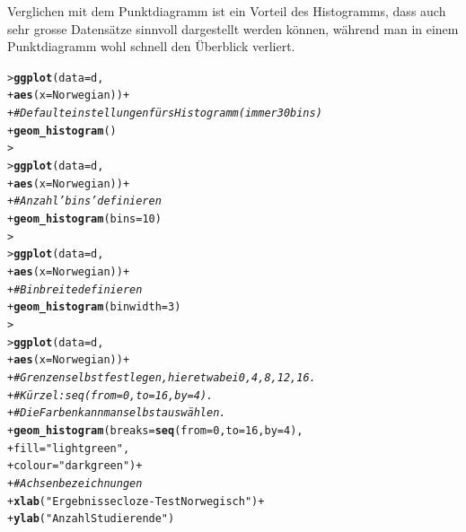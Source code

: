 \documentclass[oneside, 10pt]{book}\usepackage[]{graphicx}\usepackage[]{xcolor}
\makeatletter
\newcommand{\hlnum}[1]{\textcolor[rgb]{0.686,0.059,0.569}{#1}}%
\newcommand{\hlstr}[1]{\textcolor[rgb]{0.192,0.494,0.8}{#1}}%
\newcommand{\hlcom}[1]{\textcolor[rgb]{0.678,0.584,0.686}{\textit{#1}}}%
\newcommand{\hlopt}[1]{\textcolor[rgb]{0,0,0}{#1}}%
\newcommand{\hlstd}[1]{\textcolor[rgb]{0.345,0.345,0.345}{#1}}%
\newcommand{\hlkwc}[1]{\textcolor[rgb]{0.333,0.667,0.333}{#1}}%
\newcommand{\hlkwd}[1]{\textcolor[rgb]{0.737,0.353,0.396}{\textbf{#1}}}%
\newenvironment{kframe}{%
 \def\at@end@of@kframe{}%
 \ifinner\ifhmode%
  \def\at@end@of@kframe{\end{minipage}}%
  \begin{minipage}{\columnwidth}%
 \fi\fi%
 \def\FrameCommand##1{\hskip\@totalleftmargin \hskip-\fboxsep
 \colorbox{shadecolor}{##1}\hskip-\fboxsep
     \hskip-\linewidth \hskip-\@totalleftmargin \hskip\columnwidth}%
 \MakeFramed {\advance\hsize-\width
   \@totalleftmargin\z@ \linewidth\hsize
   \@setminipage}}%
 {\par\unskip\endMakeFramed%
 \at@end@of@kframe}
\newenvironment{knitrout}{}{} %
\makeatother
\begin{document}
Verglichen mit dem Punktdiagramm ist ein Vorteil
des Histogramms, dass auch sehr grosse Datensätze sinnvoll
dargestellt werden können, während man in einem Punktdiagramm
wohl schnell den Überblick verliert.
\begin{knitrout}
\color{fgcolor}\begin{kframe}
\begin{alltt}
\hlstd{> }\hlkwd{ggplot}\hlstd{(}\hlkwc{data} \hlstd{= d,}
\hlstd{+ }       \hlkwd{aes}\hlstd{(}\hlkwc{x} \hlstd{= Norwegian))} \hlopt{+}
\hlstd{+ }  \hlcom{# Defaulteinstellungen fürs Histogramm (immer 30 bins)}
\hlstd{+ }  \hlkwd{geom_histogram}\hlstd{()}
\hlstd{> }
\hlstd{> }\hlkwd{ggplot}\hlstd{(}\hlkwc{data} \hlstd{= d,}
\hlstd{+ }       \hlkwd{aes}\hlstd{(}\hlkwc{x} \hlstd{= Norwegian))} \hlopt{+}
\hlstd{+ }  \hlcom{# Anzahl 'bins' definieren}
\hlstd{+ }  \hlkwd{geom_histogram}\hlstd{(}\hlkwc{bins} \hlstd{=} \hlnum{10}\hlstd{)}
\hlstd{> }
\hlstd{> }\hlkwd{ggplot}\hlstd{(}\hlkwc{data} \hlstd{= d,}
\hlstd{+ }       \hlkwd{aes}\hlstd{(}\hlkwc{x} \hlstd{= Norwegian))} \hlopt{+}
\hlstd{+ }  \hlcom{# Binbreite definieren}
\hlstd{+ }  \hlkwd{geom_histogram}\hlstd{(}\hlkwc{binwidth} \hlstd{=} \hlnum{3}\hlstd{)}
\hlstd{> }
\hlstd{> }\hlkwd{ggplot}\hlstd{(}\hlkwc{data} \hlstd{= d,}
\hlstd{+ }       \hlkwd{aes}\hlstd{(}\hlkwc{x} \hlstd{= Norwegian))} \hlopt{+}
\hlstd{+ }  \hlcom{# Grenzen selbst festlegen, hier etwa bei 0, 4, 8, 12, 16.}
\hlstd{+ }  \hlcom{# Kürzel: seq(from = 0, to = 16, by = 4).}
\hlstd{+ }  \hlcom{# Die Farben kann man selbst auswählen.}
\hlstd{+ }  \hlkwd{geom_histogram}\hlstd{(}\hlkwc{breaks} \hlstd{=} \hlkwd{seq}\hlstd{(}\hlkwc{from} \hlstd{=} \hlnum{0}\hlstd{,} \hlkwc{to} \hlstd{=} \hlnum{16}\hlstd{,} \hlkwc{by} \hlstd{=} \hlnum{4}\hlstd{),}
\hlstd{+ }                 \hlkwc{fill} \hlstd{=} \hlstr{"lightgreen"}\hlstd{,}
\hlstd{+ }                 \hlkwc{colour} \hlstd{=} \hlstr{"darkgreen"}\hlstd{)} \hlopt{+}
\hlstd{+ }  \hlcom{# Achsenbezeichnungen}
\hlstd{+ }  \hlkwd{xlab}\hlstd{(}\hlstr{"Ergebnisse cloze-Test Norwegisch"}\hlstd{)} \hlopt{+}
\hlstd{+ }  \hlkwd{ylab}\hlstd{(}\hlstr{"Anzahl Studierende"}\hlstd{)}
\end{alltt}
\end{kframe}
\end{knitrout}
\end{document}
